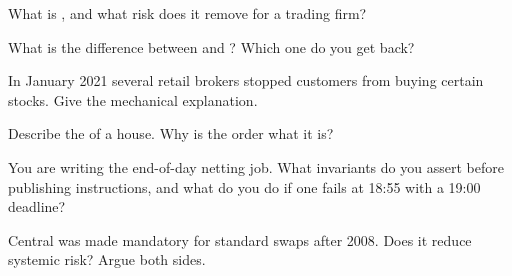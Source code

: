 \begin{interviewq}\label{iq:m1:clearing-and-settlement:1}
What is , and what risk does it remove for a trading firm?
\end{interviewq}

\begin{interviewq}\label{iq:m1:clearing-and-settlement:2}
What is the difference between  and ? Which
one do you get back?
\end{interviewq}

\begin{interviewq}\label{iq:m1:clearing-and-settlement:3}
In January 2021 several retail brokers stopped customers from buying certain
stocks. Give the mechanical explanation.
\end{interviewq}

\begin{interviewq}\label{iq:m1:clearing-and-settlement:4}
Describe the  of a  house. Why is the order what it
is?
\end{interviewq}

\begin{interviewq}\label{iq:m1:clearing-and-settlement:5}
You are writing the end-of-day netting job. What invariants do you assert
before publishing  instructions, and what do you do if one fails
at 18:55 with a 19:00 deadline?
\end{interviewq}

\begin{interviewq}\label{iq:m1:clearing-and-settlement:6}
Central  was made mandatory for standard swaps after 2008. Does it
reduce systemic risk? Argue both sides.
\end{interviewq}
